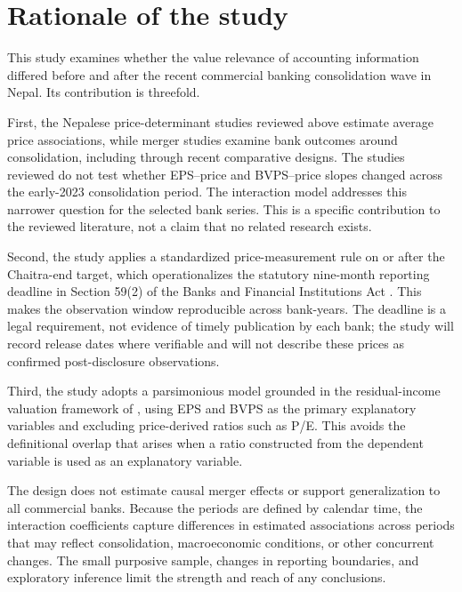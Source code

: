 \section{Rationale of the study}

This study examines whether the value relevance of accounting information
differed before and after the recent commercial banking consolidation wave in
Nepal. Its contribution is threefold.

First, the Nepalese price-determinant studies reviewed above estimate average
price associations, while merger studies examine bank outcomes
around consolidation, including through recent comparative designs. The
studies reviewed do not test whether EPS--price and BVPS--price slopes changed
across the early-2023 consolidation period. The interaction model addresses
this narrower question for the selected bank series. This is a specific
contribution to the reviewed literature, not a claim that no related research
exists.

Second, the study applies a standardized price-measurement rule on or after the
Chaitra-end target, which operationalizes the statutory nine-month reporting
deadline in Section 59(2) of the Banks and Financial Institutions Act
\citep{bafia2017}. This makes the observation window reproducible across
bank-years. The deadline is a legal requirement, not evidence of timely
publication by each bank; the study will record release dates where verifiable
and will not describe these prices as confirmed post-disclosure observations.

Third, the study adopts a parsimonious model grounded in the residual-income
valuation framework of \citet{ohlson1995}, using EPS and BVPS as the primary
explanatory variables and excluding price-derived ratios such as P/E. This
avoids the definitional overlap that arises when a ratio constructed from the
dependent variable is used as an explanatory variable.

The design does not estimate causal merger effects or support generalization
to all commercial banks. Because the periods are defined by calendar time, the
interaction coefficients capture differences in estimated associations across
periods that may reflect consolidation, macroeconomic conditions, or other
concurrent changes. The small purposive sample, changes in reporting
boundaries, and exploratory inference limit the strength and reach of any
conclusions.
